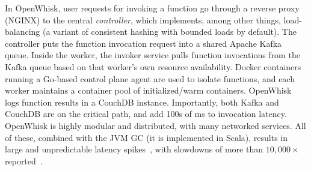 
In OpenWhisk, user requests for invoking a function go through a reverse proxy (NGINX) to the central \emph{controller}, which implements, among other things, load-balancing (a variant of consistent hashing with bounded loads by default).
The controller puts the function invocation request into a shared Apache Kafka~\cite{kafka} queue.
Inside the worker, the invoker service pulls function invocations from the Kafka queue based on that worker's own resource availability.
Docker containers running a Go-based control plane agent are used to isolate functions, and each worker maintains a container pool of initialized/warm containers.
OpenWhisk logs function results in a CouchDB instance.
Importantly, both Kafka and CouchDB are on the critical path, and add 100s of ms to invocation latency.
%
OpenWhisk is highly modular and distributed, with many networked services.
All of these, combined with the JVM GC (it is implemented in Scala), results in large and unpredictable latency spikes~\cite{faaslb-hpdc22, hotcarbon22-faas}, with slowdowns of more than $10,000\times$ reported~\cite{zuk_call_2022}. 


